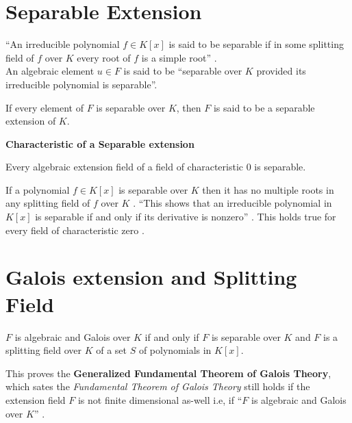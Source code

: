 \section{Separable Extension}
``An irreducible polynomial \(f \in K[x]\) is said to be separable if in some splitting field of \(f\) over \(K\) every root of \(f\) is a simple root'' \cite{hunger}.\\
An algebraic element \(u \in F\) is said to be ``separable over \(K\) provided its irreducible polynomial is separable''\cite{hunger}.
\begin{definition} \cite{hunger}
  If every element of \(F\) is separable over \(K\), then \(F\) is said to be a separable extension of \(K\).
\end{definition}
\vspace{3mm}
\noindent
\textbf{Characteristic of a Separable extension}
\begin{remark} \cite{hunger}
  Every algebraic extension field of a field of characteristic \(0\) is separable.
  \end{remark}
If a polynomial \(f \in K[x]\) is separable over \(K\) then it has no multiple roots in any splitting field of \(f\) over \(K\) \cite{hunger}. ``This shows that an irreducible polynomial in \(K[x]\) is separable if and only if its derivative is nonzero'' \cite{hunger}. This holds true for every field of characteristic zero \cite{hunger}.

\section{Galois extension and Splitting Field}
\begin{theorem} \cite{hunger}
  \(F\) is algebraic and Galois over \(K\) if and only if \(F\) is separable over \(K\) and \(F\) is a splitting field over \(K\) of a set \(S\) of polynomials in \(K[x]\).
  \end{theorem}

This proves the \textbf{Generalized Fundamental Theorem of Galois Theory},\\
which sates the \textit{Fundamental Theorem of Galois Theory} still holds if the extension field \(F\) is not finite dimensional as-well i.e, if ``\(F\) is algebraic and Galois over \(K\)'' \cite{hunger}.

